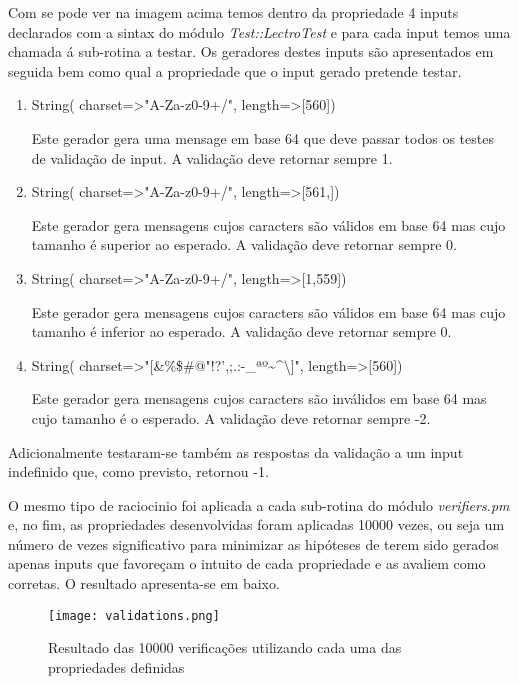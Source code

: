 Com se pode ver na imagem acima temos dentro da propriedade 4 inputs declarados com a sintax do módulo \textit{Test::LectroTest} e para cada input temos uma chamada á sub-rotina a testar. Os geradores destes inputs são apresentados em seguida bem como qual a propriedade que o input gerado pretende testar.
\begin{enumerate}
	\item String( charset=>"A-Za-z0-9+/", length=>[560])
	\par Este gerador gera uma mensage em base 64 que deve passar todos os testes de validação de input. A validação deve retornar sempre 1.\newline
	\item String( charset=>"A-Za-z0-9+/", length=>[561,])
	\par Este gerador gera mensagens cujos caracters são válidos em base 64 mas cujo tamanho é superior ao esperado. A validação deve retornar sempre 0.\newline
	\item String( charset=>"A-Za-z0-9+/", length=>[1,559])
	\par Este gerador gera mensagens cujos caracters são válidos em base 64 mas cujo tamanho é inferior ao esperado. A validação deve retornar sempre 0.\newline
	\item String( charset=>"[\&\%\$\#@"!?',;.:-\_ªº\textasciitilde\^{}\textbackslash\textbar]", length=>[560])
	\par Este gerador gera mensagens cujos caracters são inválidos em base 64 mas cujo tamanho é o esperado. A validação deve retornar sempre -2.
\end{enumerate}

Adicionalmente testaram-se também as respostas da validação a um input indefinido que, como previsto, retornou -1.

\par O mesmo tipo de raciocinio foi aplicada a cada sub-rotina do módulo \textit{verifiers.pm} e, no fim, as propriedades desenvolvidas foram aplicadas 10000 vezes, ou seja um número de vezes significativo para minimizar as hipóteses de terem sido gerados apenas inputs que favoreçam o intuito de cada propriedade e as avaliem como corretas. O resultado apresenta-se em baixo.


\begin{figure}[H]

  \centering
  \captionsetup{justification=centering}

  \texttt{[image: validations.png]}
  
  \caption {Resultado das 10000 verificações utilizando cada uma das propriedades definidas}

\end{figure}



